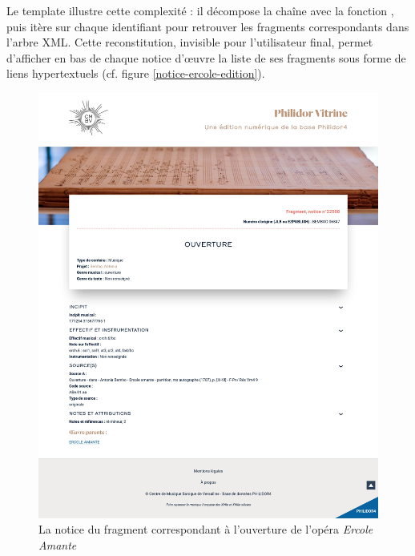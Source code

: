 Le template  illustre cette complexité : il décompose la chaîne  avec la fonction , puis itère sur chaque identifiant pour retrouver les fragments correspondants dans l'arbre XML. Cette reconstitution, invisible pour l'utilisateur final, permet d'afficher en bas de chaque notice d'œuvre la liste de ses fragments sous forme de liens hypertextuels (cf. figure \ref{notice-ercole-edition}).

\begin{figure}[p]
	\caption{La notice du fragment correspondant à l'ouverture de l'opéra \textit{Ercole Amante}} \label{notice-ercole-frag-edition}
	\centering
	\includegraphics[width=\textwidth]{images/ercole-amante-frag-edition-philidor.jpeg}
\end{figure}


